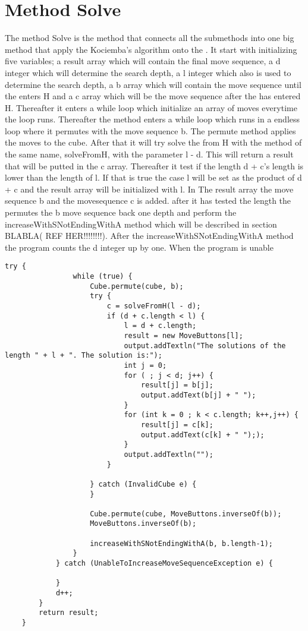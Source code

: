 \section{Method Solve}

The method Solve is the method that connects all the submethods into one big method that apply the Kociemba's algorithm onto the \rubik{}. It start with initializing five variables; a result array which will contain the final move sequence, a d integer which will determine the search depth, a l integer which also is used to determine the search depth, a b array which will contain the move sequence until the \rubik{} enters H and a c array which will be the move sequence after the \rubik{} has entered H. Thereafter it enters a while loop which initialize an array of moves everytime the loop runs. Thereafter the method enters a while loop which runs in a endless loop where it permutes with the move sequence b. The permute method applies the moves to the cube. After that it will try solve the \rubik{} from H with the method of the same name, solveFromH, with the parameter l - d.  This will return a result that will be putted in the c array. Thereafter it test if the length d + c's length is lower than the length of l. If that is true the case l will be set as the product of d + c and the result array will be initialized with l. In The result array the move sequence b and the movesequence c is added. after it has tested the length the \rubik{}  permutes the b move sequence back one depth and perform the increaseWithSNotEndingWithA method which will be described in section BLABLA( REF HER!!!!!!!!). After the increaseWithSNotEndingWithA method the program counts the d integer up by one. When the program is unable


\begin{verbatim}
try {
				while (true) {
					Cube.permute(cube, b);
					try {
						c = solveFromH(l - d);
						if (d + c.length < l) {
							l = d + c.length;
							result = new MoveButtons[l];
							output.addTextln("The solutions of the length " + l + ". The solution is:");
							int j = 0;
							for ( ; j < d; j++) {
								result[j] = b[j];
								output.addText(b[j] + " ");
							} 
							for (int k = 0 ; k < c.length; k++,j++) {
								result[j] = c[k];
								output.addText(c[k] + " "););
							}
							output.addTextln("");
						}

					} catch (InvalidCube e) {
					}
					
					Cube.permute(cube, MoveButtons.inverseOf(b));
					MoveButtons.inverseOf(b);					
					
					increaseWithSNotEndingWithA(b, b.length-1);
				}
			} catch (UnableToIncreaseMoveSequenceException e) {

			}
			d++;
		}
		return result;
	}
\end{verbatim}